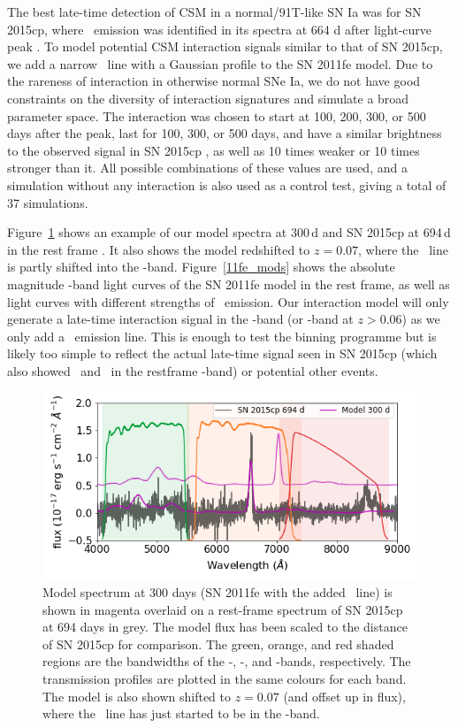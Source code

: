 \documentclass[a4paper,oneside,12pt, class=Latex/Classes/PhDthesisPSnPDF, crop=false]{standalone}
\begin{document}
 The best late-time detection of CSM in a normal/91T-like SN Ia was for SN 2015cp, where \Halpha\ emission was identified in its spectra at 664 d after light-curve peak \citep{2015cp}. To model potential CSM interaction signals similar to that of SN 2015cp, we add a narrow \Halpha~line with a Gaussian profile to the SN 2011fe model. Due to the rareness of interaction in otherwise normal SNe Ia, we do not have good constraints on the diversity of interaction signatures and simulate a broad parameter space. The interaction was chosen to start at 100, 200, 300, or 500 days after the peak, last for 100, 300, or 500 days, and have a similar brightness to the observed signal in SN 2015cp \citep{2015cp}, as well as 10 times weaker or 10 times stronger than it. All possible combinations of these values are used, and a simulation without any interaction is also used as a control test, giving a total of 37 simulations. 

Figure~\ref{mod_15cp_comp} shows an example of our model spectra at 300\,d and SN 2015cp at 694\,d in the rest frame \citep{2015cp}. It also shows the model redshifted to $z = 0.07$, where the \Halpha~line is partly shifted into the \ztfi-band. Figure~\ref{11fe_mods} shows the absolute magnitude \ztfr\ztfi-band light curves of the SN 2011fe model in the rest frame, as well as light curves with different strengths of \Halpha~emission. Our interaction model will only generate a late-time interaction signal in the \ztfr-band (or \ztfi-band at $z > 0.06$) as we only add a \Halpha\ emission line. This is enough to test the binning programme but is likely too simple to reflect the actual late-time signal seen in SN 2015cp (which also showed \OI\ and \CaII\ in the restframe \ztfi-band) or potential other events.


\begin{figure}
 \centering
 \includegraphics[width=\textwidth]{../Images/chapter_3/Model_15cp_comparison.png}
 \caption{Model spectrum at 300 days (SN 2011fe with the added \Halpha~line) is shown in magenta overlaid on a rest-frame spectrum of SN 2015cp at 694 days in grey. The model flux has been scaled to the distance of SN 2015cp for comparison. The green, orange, and red shaded regions are the bandwidths of the \ztfg-, \ztfr-, and \ztfi-bands, respectively. The transmission profiles are plotted in the same colours for each band. The model is also shown shifted to $z = 0.07$ (and offset up in flux), where the \Halpha~line has just started to be in the \ztfi-band.}
 \label{mod_15cp_comp}
\end{figure}
\end{document}

